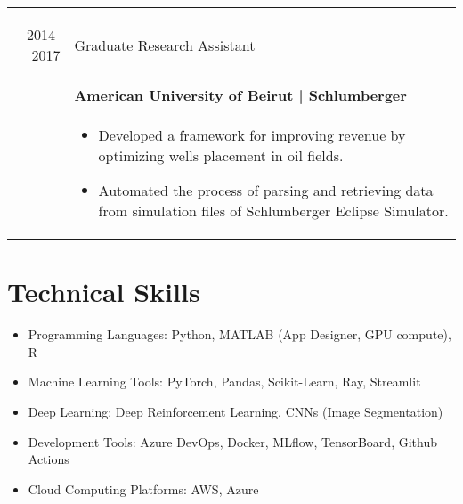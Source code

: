 \documentclass[10pt]{article}
\begin{document}
\begin{tabular}{r|p{16cm}}
{\begin{itemize}
 \end{itemize} }
\multicolumn{3}{c}{}
 \textsc{2014-2017} & Graduate Research Assistant \\&\textbf{American University of Beirut | Schlumberger}\\&{
 \begin{itemize}
\item Developed a framework for improving revenue by optimizing wells placement in oil fields.
\item Automated the process of parsing and retrieving data from simulation files of Schlumberger Eclipse Simulator.
 \end{itemize}
 }
 
\end{tabular}

\section{Technical Skills}
 \begin{itemize}
\item Programming Languages: Python, MATLAB (App Designer, GPU compute), R
\item Machine Learning Tools: PyTorch, Pandas, Scikit-Learn, Ray, Streamlit
\item Deep Learning: Deep Reinforcement Learning, CNNs (Image Segmentation)
\item Development Tools: Azure DevOps, Docker, MLflow, TensorBoard, Github Actions
\item Cloud Computing Platforms: AWS, Azure
 \end{itemize}
\end{document}
